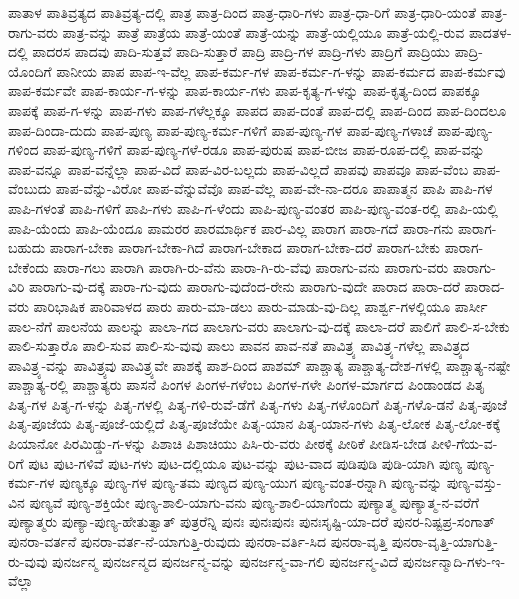 {ಪಾತಾಳ
ಪಾತಿವ್ರತ್ಯದ
ಪಾತಿವ್ರತ್ಯ-ದಲ್ಲಿ
ಪಾತ್ರ
ಪಾತ್ರ-ದಿಂದ
ಪಾತ್ರ-ಧಾರಿ-ಗಳು
ಪಾತ್ರ-ಧಾ-ರಿಗೆ
ಪಾತ್ರ-ಧಾರಿ-ಯಂತೆ
ಪಾತ್ರ-ರಾಗು-ವರು
ಪಾತ್ರ-ವನ್ನು
ಪಾತ್ರೆ
ಪಾತ್ರೆಯ
ಪಾತ್ರೆ-ಯಂತೆ
ಪಾತ್ರೆ-ಯನ್ನು
ಪಾತ್ರೆ-ಯಲ್ಲಿಯೂ
ಪಾತ್ರೆ-ಯಲ್ಲಿ-ರುವ
ಪಾದತಳ-ದಲ್ಲಿ
ಪಾದರಸ
ಪಾದವು
ಪಾದಿ-ಸುತ್ತವೆ
ಪಾದಿ-ಸುತ್ತಾರೆ
ಪಾದ್ರಿ
ಪಾದ್ರಿ-ಗಳ
ಪಾದ್ರಿ-ಗಳು
ಪಾದ್ರಿಗೆ
ಪಾದ್ರಿಯು
ಪಾದ್ರಿ-ಯೊಂದಿಗೆ
ಪಾನೀಯ
ಪಾಪ
ಪಾಪ-ಇ-ವೆಲ್ಲ
ಪಾಪ-ಕರ್ಮ-ಗಳ
ಪಾಪ-ಕರ್ಮ-ಗ-ಳನ್ನು
ಪಾಪ-ಕರ್ಮದ
ಪಾಪ-ಕರ್ಮವು
ಪಾಪ-ಕರ್ಮವೇ
ಪಾಪ-ಕಾರ್ಯ-ಗ-ಳನ್ನು
ಪಾಪ-ಕಾರ್ಯ-ಗಳು
ಪಾಪ-ಕೃತ್ಯ-ಗ-ಳನ್ನು
ಪಾಪ-ಕೃತ್ಯ-ದಿಂದ
ಪಾಪಕ್ಕೂ
ಪಾಪಕ್ಕೆ
ಪಾಪ-ಗ-ಳನ್ನು
ಪಾಪ-ಗಳು
ಪಾಪ-ಗಳೆಲ್ಲಕ್ಕೂ
ಪಾಪದ
ಪಾಪ-ದಂತೆ
ಪಾಪ-ದಲ್ಲಿ
ಪಾಪ-ದಿಂದ
ಪಾಪ-ದಿಂದಲೂ
ಪಾಪ-ದಿಂದಾ-ದುದು
ಪಾಪ-ಪುಣ್ಯ
ಪಾಪ-ಪುಣ್ಯ-ಕರ್ಮ-ಗಳಿಗೆ
ಪಾಪ-ಪುಣ್ಯ-ಗಳ
ಪಾಪ-ಪುಣ್ಯ-ಗಳಾಚೆ
ಪಾಪ-ಪುಣ್ಯ-ಗಳಿಂದ
ಪಾಪ-ಪುಣ್ಯ-ಗಳಿಗೆ
ಪಾಪ-ಪುಣ್ಯ-ಗಳೆ-ರಡೂ
ಪಾಪ-ಪುರುಷ
ಪಾಪ-ಬೀಜ
ಪಾಪ-ರೂಪ-ದಲ್ಲಿ
ಪಾಪ-ವನ್ನು
ಪಾಪ-ವನ್ನೂ
ಪಾಪ-ವನ್ನೆಲ್ಲಾ
ಪಾಪ-ವಿದೆ
ಪಾಪ-ವಿರ-ಬಲ್ಲದು
ಪಾಪ-ವಿಲ್ಲದೆ
ಪಾಪವು
ಪಾಪವೂ
ಪಾಪ-ವೆಂಬ
ಪಾಪ-ವೆಂಬುದು
ಪಾಪ-ವೆನ್ನು-ವಿರೋ
ಪಾಪ-ವೆನ್ನುವೆವೊ
ಪಾಪ-ವೆಲ್ಲ
ಪಾಪ-ವೇ-ನಾ-ದರೂ
ಪಾಪಾತ್ಮನ
ಪಾಪಿ
ಪಾಪಿ-ಗಳ
ಪಾಪಿ-ಗಳಂತೆ
ಪಾಪಿ-ಗಳಿಗೆ
ಪಾಪಿ-ಗಳು
ಪಾಪಿ-ಗ-ಳೆಂದು
ಪಾಪಿ-ಪುಣ್ಯ-ವಂತರ
ಪಾಪಿ-ಪುಣ್ಯ-ವಂತ-ರಲ್ಲಿ
ಪಾಪಿ-ಯಲ್ಲಿ
ಪಾಪಿ-ಯೆಂದು
ಪಾಪಿ-ಯೆಂದೂ
ಪಾಮರರ
ಪಾರಮಾರ್ಥಿಕ
ಪಾರ-ವಿಲ್ಲ
ಪಾರಾಗ
ಪಾರಾ-ಗದೆ
ಪಾರಾ-ಗನು
ಪಾರಾಗ-ಬಹುದು
ಪಾರಾಗ-ಬೇಕಾ
ಪಾರಾಗ-ಬೇಕಾ-ಗಿದೆ
ಪಾರಾಗ-ಬೇಕಾದ
ಪಾರಾಗ-ಬೇಕಾ-ದರೆ
ಪಾರಾಗ-ಬೇಕು
ಪಾರಾಗ-ಬೇಕೆಂದು
ಪಾರಾ-ಗಲು
ಪಾರಾಗಿ
ಪಾರಾಗಿ-ರು-ವೆನು
ಪಾರಾ-ಗಿ-ರು-ವೆವು
ಪಾರಾಗು-ವನು
ಪಾರಾಗು-ವರು
ಪಾರಾಗು-ವಿರಿ
ಪಾರಾಗು-ವು-ದಕ್ಕೆ
ಪಾರಾ-ಗು-ವುದು
ಪಾರಾಗು-ವುದೆಂದ-ರೇನು
ಪಾರಾಗು-ವುದೇ
ಪಾರಾದ
ಪಾರಾ-ದರೆ
ಪಾರಾದ-ವರು
ಪಾರಿಭಾಷಿಕ
ಪಾರಿವಾಳದ
ಪಾರು
ಪಾರು-ಮಾ-ಡಲು
ಪಾರು-ಮಾಡು-ವು-ದಿಲ್ಲ
ಪಾರ್ಶ್ವ-ಗಳಲ್ಲಿಯೂ
ಪಾರ್ಸೀ
ಪಾಲ-ನೆಗೆ
ಪಾಲನೆಯ
ಪಾಲನ್ನು
ಪಾಲಾ-ಗದ
ಪಾಲಾಗು-ವರು
ಪಾಲಾಗು-ವು-ದಕ್ಕೆ
ಪಾಲಾ-ದರೆ
ಪಾಲಿಗೆ
ಪಾಲಿ-ಸ-ಬೇಕು
ಪಾಲಿ-ಸುತ್ತಾರೊ
ಪಾಲಿ-ಸುವ
ಪಾಲಿ-ಸು-ವುವು
ಪಾಲು
ಪಾವನ
ಪಾವ-ನತೆ
ಪಾವಿತ್ರ್ಯ
ಪಾವಿತ್ರ್ಯ-ಗಳೆಲ್ಲ
ಪಾವಿತ್ರ್ಯದ
ಪಾವಿತ್ರ್ಯ-ವನ್ನು
ಪಾವಿತ್ರ್ಯವು
ಪಾವಿತ್ರ್ಯವೇ
ಪಾಶಕ್ಕೆ
ಪಾಶ-ದಿಂದ
ಪಾಶಮ್
ಪಾಶ್ಚಾತ್ಯ
ಪಾಶ್ಚಾತ್ಯ-ದೇಶ-ಗಳಲ್ಲಿ
ಪಾಶ್ಚಾತ್ಯ-ನಷ್ಟೇ
ಪಾಶ್ಚಾತ್ಯ-ರಲ್ಲಿ
ಪಾಶ್ಚಾತ್ಯರು
ಪಾಸನೆ
ಪಿಂಗಳ
ಪಿಂಗಳ-ಗಳೆಂಬ
ಪಿಂಗಳ-ಗಳೇ
ಪಿಂಗಳ-ಮಾರ್ಗದ
ಪಿಂಡಾಂಡದ
ಪಿತೃ
ಪಿತೃ-ಗಳ
ಪಿತೃ-ಗ-ಳನ್ನು
ಪಿತೃ-ಗಳಲ್ಲಿ
ಪಿತೃ-ಗಳಿ-ರುವೆ-ಡೆಗೆ
ಪಿತೃ-ಗಳು
ಪಿತೃ-ಗಳೊಂದಿಗೆ
ಪಿತೃ-ಗಳೊ-ಡನೆ
ಪಿತೃ-ಪೂಜೆ
ಪಿತೃ-ಪೂಜೆಯ
ಪಿತೃ-ಪೂಜೆ-ಯಲ್ಲಿದೆ
ಪಿತೃ-ಪೂಜೆಯೇ
ಪಿತೃ-ಯಾನ
ಪಿತೃ-ಯಾನ-ಗಳು
ಪಿತೃ-ಲೋಕ
ಪಿತೃ-ಲೋ-ಕಕ್ಕೆ
ಪಿಯಾನೋ
ಪಿರಮಿಡ್ಡು-ಗ-ಳನ್ನು
ಪಿಶಾಚಿ
ಪಿಶಾಚಿಯು
ಪಿಸಿ-ರು-ವರು
ಪೀಠಕ್ಕೆ
ಪೀಠಿಕೆ
ಪೀಡಿಸ-ಬೇಡ
ಪೀಳಿ-ಗೆಯ-ವ-ರಿಗೆ
ಪುಟ
ಪುಟ-ಗಳಿವೆ
ಪುಟ-ಗಳು
ಪುಟ-ದಲ್ಲಿಯೂ
ಪುಟ-ವನ್ನು
ಪುಟ-ವಾದ
ಪುಡಿಪುಡಿ
ಪುಡಿ-ಯಾಗಿ
ಪುಣ್ಯ
ಪುಣ್ಯ-ಕರ್ಮ-ಗಳ
ಪುಣ್ಯಕ್ಕೂ
ಪುಣ್ಯ-ಗಳ
ಪುಣ್ಯ-ತಮ
ಪುಣ್ಯದ
ಪುಣ್ಯ-ಯುಗ
ಪುಣ್ಯ-ವಂತ-ರನ್ನಾಗಿ
ಪುಣ್ಯ-ವನ್ನು
ಪುಣ್ಯ-ವಸ್ತು-ವಿನ
ಪುಣ್ಯವೆ
ಪುಣ್ಯ-ಶಕ್ತಿಯೇ
ಪುಣ್ಯ-ಶಾಲಿ-ಯಾಗು-ವನು
ಪುಣ್ಯ-ಶಾಲಿ-ಯಾಗೆಂದು
ಪುಣ್ಯಾತ್ಮ
ಪುಣ್ಯಾತ್ಮ-ನ-ವರೆಗೆ
ಪುಣ್ಯಾತ್ಮರು
ಪುಣ್ಯಾ-ಪುಣ್ಯ-ಹೇತುತ್ವಾತ್
ಪುತ್ರರೆನ್ನಿ
ಪುನಃ
ಪುನಃಪುನಃ
ಪುನಃಸೃಷ್ಟಿ-ಯಾ-ದರೆ
ಪುನರ-ನಿಷ್ಟಪ್ರ-ಸಂಗಾತ್
ಪುನರಾ-ವರ್ತನೆ
ಪುನರಾ-ವರ್ತ-ನೆ-ಯಾಗುತ್ತಿ-ರುವುದು
ಪುನರಾ-ವರ್ತಿ-ಸಿದ
ಪುನರಾ-ವೃತ್ತಿ
ಪುನರಾ-ವೃತ್ತಿ-ಯಾಗುತ್ತಿ-ರು-ವುವು
ಪುನರ್ಜನ್ಮ
ಪುನರ್ಜನ್ಮದ
ಪುನರ್ಜನ್ಮ-ವನ್ನು
ಪುನರ್ಜನ್ಮ-ವಾ-ಗಲಿ
ಪುನರ್ಜನ್ಮ-ವಿದೆ
ಪುನರ್ಜನ್ಮಾದಿ-ಗಳು-ಇ-ವೆಲ್ಲಾ
}
